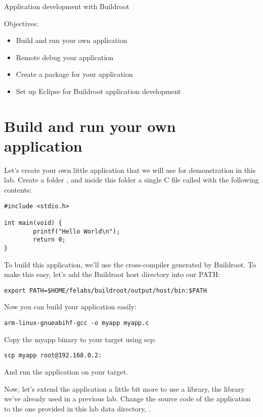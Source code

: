 \subchapter
{Application development with Buildroot}
{Objectives:
  \begin{itemize}
  \item Build and run your own application
  \item Remote debug your application
  \item Create a package for your application
  \item Set up Eclipse for Buildroot application development
  \end{itemize}
}

\section{Build and run your own application}

Let's create your own little application that we will use for
demonstration in this lab. Create a folder ,
and inside this folder a single C file called  with the
following contents:

\begin{verbatim}
#include <stdio.h>

int main(void) {
        printf("Hello World\n");
        return 0;
}
\end{verbatim}

To build this application, we'll use the cross-compiler generated by
Buildroot. To make this easy, let's add the Buildroot host directory
into our PATH:

\begin{verbatim}
export PATH=$HOME/felabs/buildroot/output/host/bin:$PATH
\end{verbatim}

Now you can build your application easily:

\begin{verbatim}
arm-linux-gnueabihf-gcc -o myapp myapp.c
\end{verbatim}

Copy the myapp binary to your target using scp:

\begin{verbatim}
scp myapp root@192.168.0.2:
\end{verbatim}

And run the  application on your target.

Now, let's extend the application a little bit more to use a library,
the  library we've already used in a previous
lab. Change the source code of the application to the one provided in
this lab data directory, .

